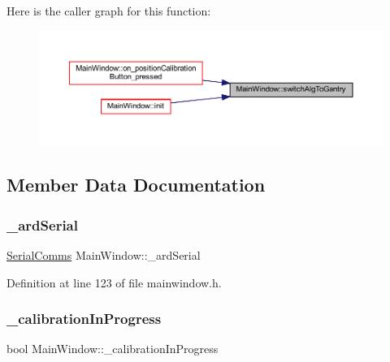 Here is the caller graph for this function\+:
\nopagebreak
\begin{figure}[H]
\begin{center}
\leavevmode
\includegraphics[width=350pt]{class_main_window_a28c0f3e2856ce2c44ba3ddad62a302a6_icgraph}
\end{center}
\end{figure}


\subsection{Member Data Documentation}
\mbox{\label{class_main_window_a06b8d20af620251ae9bb2f4ffea9a472}} 
\subsubsection{\texorpdfstring{\_ardSerial}{\_ardSerial}}
{\footnotesize\ttfamily \mbox{\hyperlink{class_serial_comms}{Serial\+Comms}} Main\+Window\+::\+\_\+ard\+Serial\hspace{0.3cm}{\ttfamily [private]}}



Definition at line 123 of file mainwindow.\+h.

\mbox{\label{class_main_window_a81af7103c9294df962389000354a6ca8}} 
\subsubsection{\texorpdfstring{\_calibrationInProgress}{\_calibrationInProgress}}
{\footnotesize\ttfamily bool Main\+Window\+::\+\_\+calibration\+In\+Progress\hspace{0.3cm}{\ttfamily [private]}}




